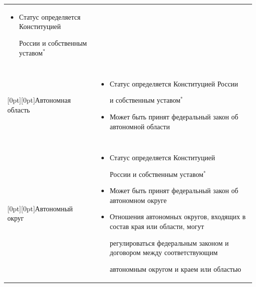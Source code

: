 \begin{table}
\begin{center}
\begin{tabular}{|l|p{84mm}|}
\begin{itemize}


\addtolength{\itemsep}{-6pt}\item Статус определяется Конституцией


России и собственным уставом$^*$\end{itemize}\\


     &\\[-18pt]


\hline


     &\\[-24pt]


\multicolumn{1}{|l|}{\raisebox{-16pt}[0pt][0pt]{Автономная область}}&




\begin{itemize}


\addtolength{\itemsep}{-6pt}\item Статус определяется Конституцией России


и собственным уставом$^*$


\item Может быть принят федеральный закон об автономной области\end{itemize}\\


     &\\[-18pt]


\hline


     &\\[-24pt]


\multicolumn{1}{|l|}{\raisebox{-16pt}[0pt][0pt]{Автономный округ}}&


\begin{itemize}


\addtolength{\itemsep}{-6pt}\item Статус определяется Конституцией


России и собственным уставом$^*$


\item Может быть принят федеральный закон об автономном округе


\item Отношения автономных округов, входящих в состав края или области, могут


регулироваться федеральным законом и договором между соответствующим


автономным округом и краем или областью\vspace*{-6pt}\end{itemize}\\



\end{tabular}
\end{center}
\end{table}
